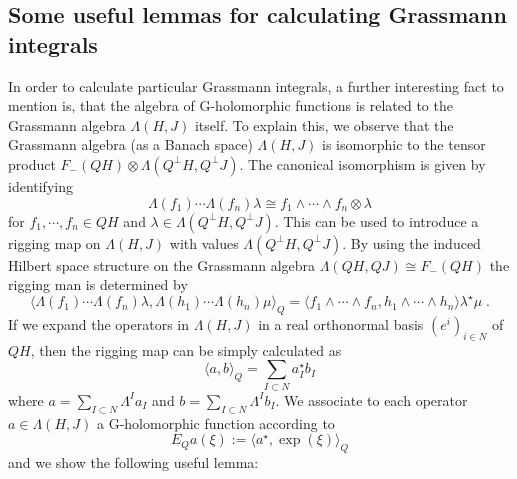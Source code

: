 \documentclass[pra,twoside,amsmath,amsfonts,amssymb,superscriptaddress,showpacs]{revtex4}
\newcommand{\AFOCK}[1]{F_-(#1)}
\newcommand{\SPROD}[2]{\langle{#1},{#2}\rangle}
\newcommand{\RIGG}[3]{{\langle}{#1},{#2}{\rangle}_{#3}}
\newcommand{\GR}[2]{\Lambda(#1,#2)}
\newcommand{\ADJ}{\star}
\begin{document}
\subsection{Some useful lemmas for calculating Grassmann integrals}
In order to calculate particular Grassmann integrals, a further interesting fact to mention is, that
the algebra of G-holomorphic functions is related to the Grassmann algebra $\GR{H}{J}$ itself. To
explain this, we observe that the Grassmann algebra (as a Banach space) $\GR{H}{J}$ is isomorphic to
the tensor product $\AFOCK{QH}\otimes\GR{Q^\perp H}{Q^\perp J}$. The canonical isomorphism is given
by identifying
\begin{equation}
\Lambda(f_1)\cdots \Lambda(f_n)\lambda\cong f_1\wedge\cdots\wedge f_n\otimes \lambda
\end{equation}
for $f_1,\cdots,f_n\in QH$ and $\lambda\in\GR{Q^\perp H}{Q^\perp J}$. This can be used
to introduce a rigging map on $\GR{H}{J}$ with values $\GR{Q^\perp H}{Q^\perp J}$.  By using the
induced Hilbert space structure on the Grassmann algebra $\GR{QH}{QJ}\cong \AFOCK{QH}$ the rigging
man is determined by 
\begin{equation}
\RIGG{\Lambda(f_1)\cdots \Lambda(f_n)\lambda}{\Lambda(h_1)\cdots\Lambda(h_n)\mu}{Q}
=\SPROD{f_1\wedge\cdots \wedge f_n}{h_1\wedge\cdots \wedge h_n}\lambda^\ADJ\mu \; .
\end{equation}
If we expand the operators in $\GR{H}{J}$ in a real orthonormal basis $(e^i)_{i\in N}$ of $QH$,
then the rigging map can be simply calculated as
\begin{equation}
\RIGG{a}{b}{Q}=\sum_{I\subset N}a_I^\ADJ b_I
\end{equation}
where $a=\sum_{I\subset N} \Lambda^I a_I$ and $b=\sum_{I\subset N} \Lambda^Ib_I$. We
associate to each operator $a\in\GR{H}{J}$ a G-holomorphic function according to 
\begin{equation}
E_Qa(\xi):=\RIGG{a^\ADJ}{\exp(\xi)}{Q}
\end{equation}
and we show the following useful lemma:
\end{document}
